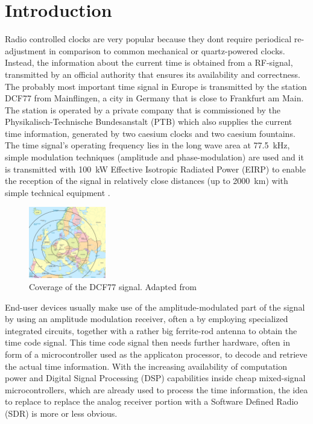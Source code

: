 \documentclass[conference]{IEEEtran}
\begin{document}
\section{Introduction}
Radio controlled clocks are very popular because they dont require periodical re-adjustment in comparison to common mechanical or quartz-powered clocks.
Instead, the information about the current time is obtained from a RF-signal, transmitted by an official authority that ensures its availability and correctness.
The probably most important time signal in Europe is transmitted by the station DCF77 from Mainflingen, a city in Germany that is close to Frankfurt am Main.
The station is operated by a private company that is commissioned by the Physikalisch-Technische Bundesanstalt (PTB) which also supplies the current time information,
generated by two caesium clocks and two caesium fountains.
The time signal's operating frequency lies in the long wave area at \SI{77.5}{\kilo\hertz}, simple modulation techniques (amplitude and phase-modulation) are used and it is transmitted with \SI{100}{\kilo\watt} Effective Isotropic Radiated Power (EIRP) to enable the reception of the
signal in relatively close distances (up to \SI{2000}{\kilo\meter}) with simple technical equipment \cite{b2}.
\begin{figure}[!htbp]
    \centerline{\includegraphics[width=0.3\textwidth]{img/dcf77_range.jpg}}
    \caption{Coverage of the DCF77 signal. Adapted from \cite{b1}}
    \label{fig:dcf77_range}
\end{figure}
\FloatBarrier
End-user devices usually make use of the amplitude-modulated part of the signal by using an amplitude modulation receiver, often a by employing specialized integrated circuits,
together with a rather big ferrite-rod antenna to obtain the time code signal.
This time code signal then needs further hardware, often in form of a microcontroller used as the applicaton processor, to decode and retrieve the actual time information.
With the increasing availability of computation power and Digital Signal Processing (DSP) capabilities inside cheap mixed-signal microcontrollers, which are already used
to process the time information, the idea to replace to replace the analog receiver portion with a Software Defined Radio (SDR) is more or less obvious.
\end{document}
